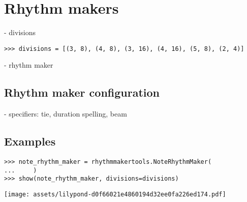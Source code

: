 \section{Rhythm makers}

- divisions

\begin{comment}
<abjad>
divisions = [(3, 8), (4, 8), (3, 16), (4, 16), (5, 8), (2, 4)]
</abjad>
\end{comment}

\begin{singlespacing}
\vspace{-0.5\baselineskip}
\begin{lstlisting}
>>> divisions = [(3, 8), (4, 8), (3, 16), (4, 16), (5, 8), (2, 4)]
\end{lstlisting}
\end{singlespacing}

- rhythm maker

\subsection{Rhythm maker configuration} %

- specifiers: tie, duration spelling, beam

\subsection{Examples} %

\begin{comment}
<abjad>
note_rhythm_maker = rhythmmakertools.NoteRhythmMaker(
    )
show(note_rhythm_maker, divisions=divisions)
</abjad>
\end{comment}

\begin{singlespacing}
\vspace{-0.5\baselineskip}
\begin{lstlisting}
>>> note_rhythm_maker = rhythmmakertools.NoteRhythmMaker(
...     )
>>> show(note_rhythm_maker, divisions=divisions)
\end{lstlisting}
\noindent\texttt{[image: assets/lilypond-d0f66021e4860194d32ee0fa226ed174.pdf]}
\end{singlespacing}

